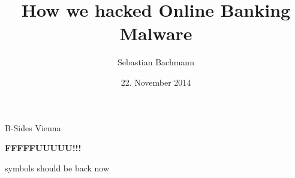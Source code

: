 \documentclass[11pt,a4paper]{beamer}
\author{Sebastian Bachmann}
\title{How we hacked Online Banking Malware}
\date{22. November 2014}
\newcommand{\mybox}[1]{\par\noindent\colorbox{shadecolor}
{\color{textcolor}\parbox{\dimexpr\textwidth-2\fboxsep\relax}{\fontsize{3em}{3.5em}\selectfont\textbf{{#1}}}}}
\begin{document}
\begin{frame}
    \maketitle
    \centering
    B-Sides Vienna
\end{frame}

{
\begin{frame}[plain]
\mybox{FFFFFUUUUU!!!}
\end{frame}
}

\begin{frame}
    symbols should be back now
\end{frame}
\end{document}
